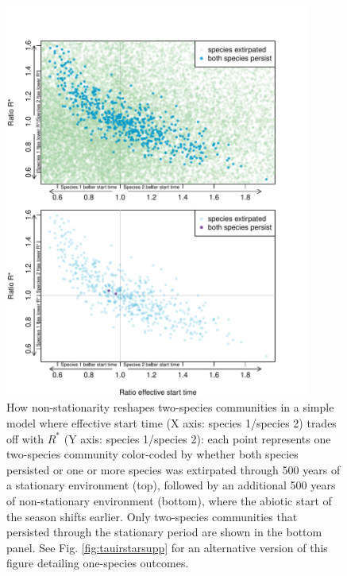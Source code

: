 \documentclass[11pt,letterpaper]{article}
\begin{document}
\begin{figure}[t!]
\centering
\includegraphics[width=0.9\textwidth]{..//..//R/graphs/modelruns/manuscript/tauIPrstart1_2panel.pdf}
\caption{How non-stationarity reshapes two-species communities in a simple model where effective start time (X axis: species 1/species 2) trades off with $R^*$ (Y axis: species 1/species 2): each point represents one two-species community color-coded by whether both species persisted or one or more species was extirpated through 500 years of a stationary environment (top), followed by an additional 500 years of non-stationary environment (bottom), where the abiotic start of the season shifts earlier. Only two-species communities that persisted through the stationary period are shown in the bottom panel. See Fig. \ref{fig:tauirstarsupp} for an alternative version of this figure detailing one-species outcomes.}
 \label{fig:tauirstar}
\end{figure}
\end{document}
